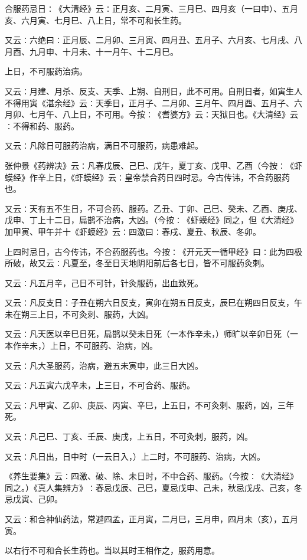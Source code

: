 \documentclass[a4paper,12pt,UTF8,twoside]{ctexbook}
\begin{document}
合服药忌日∶《大清经》云∶正月亥、二月寅、三月巳、四月亥（一曰申）、五月亥、六月寅、七月巳、八上日，常不可和长生药。

又云∶六绝曰∶正月辰、二月卯、三月寅、四月丑、五月子、六月亥、七月戌、八月酉、九月申、十月未、十一月午、十二月巳。

上日，不可服药治病。

又云∶月建、月杀、反支、天季、上朔、自刑日，此不可用。自刑日者，如寅生人不得用寅《湛余经》云∶天季日，正月子、二月卯、三月午、四月酉、五月子、六月卯、七月午、八上日，不可用。今按∶《耆婆方》云∶天狱日也。《大清经》云∶不得和药、服药。

又云∶凡除日可服药治病，满日不可服药，病患难起。

张仲景《药辨决》云∶凡春戊辰、己巳、戊午，夏丁亥、戊甲、乙酉（今按∶《虾蟆经》作辛上日，《虾蟆经》云∶皇帝禁合药日四时忌。今古传讳，不合药服药也。

又云∶天有五不生日，不可合药、服药。乙丑、丁卯、己巳、癸未、乙酉、庚戌、戊申、丁上十二日，扁鹊不治病，大凶。（今按∶《虾蟆经》同之，但《大清经》加甲寅、甲午并十《虾蟆经》云∶四激曰∶春戌、夏丑、秋辰、冬卯。

上四时忌日，古今传讳，不合药服药也。今按∶《开元天一循甲经》曰∶此为四极所破，故又云∶凡夏至，冬至日天地阴阳前后各七日，皆不可服药灸刺。

又云∶凡五月辛，己日不可针，针灸服药，出血致死。

又云∶凡反支日∶子丑在朔六日反支，寅卯在朔五日反支，辰巳在朔四日反支，午未在朔三上日，不可灸刺、服药，大凶。

又云∶凡天医以辛巳日死，扁鹊以癸未日死（一本作辛未，）师旷以辛卯日死（一本作辛未，）上日，不可服药、治病，凶。

又云∶凡大圣服药，治病，避五未寅申，此三日大凶。

又云∶凡五寅六戊辛未，上三日，不可合药、服药。

又云∶凡甲寅、乙卯、庚辰、丙寅、辛巳，上五日，不可灸刺、服药，凶，三年死。

又云∶凡己巳、丁亥、壬辰、庚戌，上五日，不可灸刺，服药，凶。

又云∶凡日出，日中时（一云日入，）上二时，不可服药、治病，大凶。

《养生要集》云∶四激、破、除、未日时，不中合药、服药。（今按∶《大清经》同之。）《真人集辨方》∶春忌戊辰、己巳，夏忌戊申、己未，秋忌戊戌、己亥，冬忌戊寅、己卯。

又云∶和合神仙药法，常避四孟，正月寅，二月巳，三月申，四月未（亥），五月寅。

以右行不可和合长生药也。当以其时王相作之，服药用意。
\end{document}
